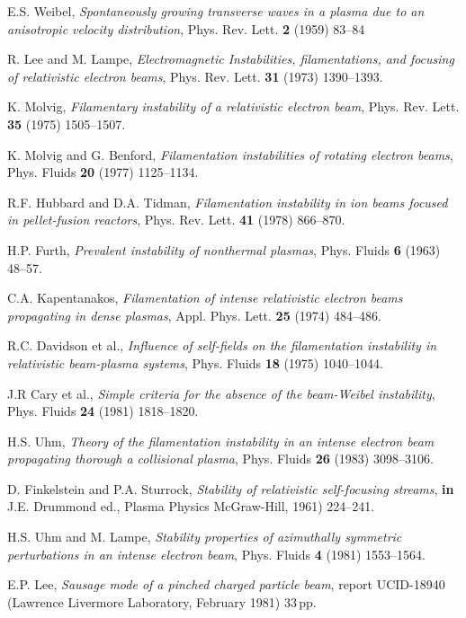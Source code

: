 \documentclass [12pt,a4paper,     ]{report} %
\begin{document}
\begin{enumerate}
 E.S. Weibel, \emph{Spontaneously growing transverse waves in a plasma due to an anisotropic velocity distribution}, Phys. Rev. Lett. {\bf 2} (1959) 83--84

 R. Lee and M. Lampe, \emph{Electromagnetic Instabilities, filamentations, and focusing of relativistic electron beams}, Phys. Rev. Lett. {\bf 31} (1973) 1390--1393.

 K. Molvig, \emph{Filamentary instability of a relativistic electron beam}, Phys. Rev. Lett. {\bf 35} (1975) 1505--1507.

 K. Molvig and G. Benford, \emph{Filamentation instabilities of rotating electron beams}, Phys. Fluids {\bf 20} (1977) 1125--1134.

 R.F. Hubbard and D.A. Tidman, \emph{Filamentation instability in ion beams focused in pellet-fusion reactors}, Phys. Rev. Lett. {\bf 41} (1978) 866--870.

 H.P. Furth, \emph{Prevalent instability of nonthermal plasmas}, Phys. Fluids {\bf 6} (1963) 48--57.

 C.A. Kapentanakos, \emph{Filamentation of intense relativistic electron beams propagating in dense plasmas}, Appl. Phys. Lett. {\bf 25} (1974) 484--486.

 R.C. Davidson et al., \emph{Influence of self-fields on the filamentation instability in relativistic beam-plasma systems}, Phys. Fluids {\bf 18} (1975) 1040--1044.

 J.R Cary et al., \emph{Simple criteria for the absence of the beam-Weibel instability}, Phys. Fluids {\bf 24} (1981) 1818--1820.

 H.S. Uhm, \emph{Theory of the filamentation instability in an intense electron beam propagating thorough a collisional plasma}, Phys. Fluids {\bf 26} (1983) 3098--3106.

 D. Finkelstein and P.A. Sturrock, \emph{Stability of relativistic self-focusing streams}, {\bf in} J.E. Drummond ed., Plasma Physics  McGraw-Hill, 1961) 224--241.

 H.S. Uhm and M. Lampe, \emph{Stability properties of azimuthally symmetric perturbations in an intense electron beam}, Phys. Fluids {\bf 4} (1981) 1553--1564.

 E.P. Lee, \emph{Sausage mode of a pinched charged particle beam}, report UCID-18940 (Lawrence Livermore Laboratory, February 1981) 33\,pp.


\end{enumerate}
\end{document}
